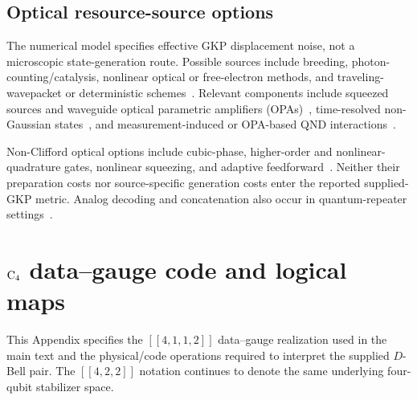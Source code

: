 \documentclass[aps,
prx,
superscriptaddress,
reprint,
longbibliography,
floatfix]{revtex4-2}
\begin{document}
\subsection{Optical resource-source options}\label{app:optical_resource_options}
The numerical model specifies effective GKP displacement noise, not a microscopic state-generation route. Possible sources include breeding, photon-counting/catalysis, nonlinear optical or free-electron methods, and traveling-wavepacket or deterministic schemes~\cite{Vasconcelos2010,Weigand2018GridStates,Eaton2019PhotonCatalysis,Tzitrin2020ApproxGKP,Eaton2022PhANTM,Hastrup2022,Fukui2022CrossKerr,Fukui2022Backcasting,Takase2023GaussianBreeding,Dahan2023FreeElectronGKP,Takase2024FlyingGKP,Pizzimenti2024SSCBreeding,Winnel2024DeterministicGKP,Erkilic2026UnifiedGKP}. Relevant components include squeezed sources and waveguide optical parametric amplifiers (OPAs)~\cite{Takeno2007NineDbSqueezing,Vahlbruch2016FifteenDbSqueezing,Kashiwazaki2020SixDbTHzPPLN,Kashiwazaki2023Over8DbWaveguide,Hirota2026TenDbWaveguide,Ha2026TwelveDbWaveguide}, time-resolved non-Gaussian states~\cite{Gerrits2010NumberResolvedPhotonSubtraction,Yukawa2013ThreePhotonSuperposition,Takase2022WaveguideCat,Sonoyama2023TimeGated,Endo2023MultiPhotonSubtractionTelecom,Sonoyama2024MultiPhotonFock,Kawasaki2024BroadbandNonGaussian}, and measurement-induced or OPA-based QND interactions~\cite{Filip2005MeasurementInducedQND,Yoshikawa2008QNDSumGate,Shiozawa2018QNDRealtime,Yanagimoto2023QNDOPA}.

Non-Clifford optical options include cubic-phase, higher-order and nonlinear-quadrature gates, nonlinear squeezing, and adaptive feedforward~\cite{Yukawa2013CubicNonlinearity,Miyata2016AdaptiveCubicGate,Marek2018NonlinearQuadratureGates,Hanamura2024MultimodeCVGates,Konno2021NonlinearSqueezing,Konno2021NonCliffordGKP,Sakaguchi2023NonlinearFeedforward,Yanagimoto2020KerrCubic}. Neither their preparation costs nor source-specific generation costs enter the reported supplied-GKP metric. Analog decoding and concatenation also occur in quantum-repeater settings~\cite{Fukui2021GKPRepeater,Rozpedek2021ConcatenatedRepeater,Rozpedek2023AllPhotonicGKPRepeater,Schmidt2024GKPQuditRepeater,Haussler2025StationaryGKPRepeater,Haussler2026StationaryFlyingGKPRepeater}.


\section{${\rm C_4}$ data--gauge code and logical maps}\label{app:c4_subsystem_rules}
This Appendix specifies the $[[4,1,1,2]]$ data--gauge realization used in the main text and the physical/code operations required to interpret the supplied $D$-Bell pair. The $[[4,2,2]]$ notation continues to denote the same underlying four-qubit stabilizer space.
\end{document}
